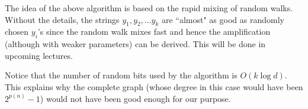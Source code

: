 The idea of the above algorithm is based on the rapid mixing of random walks. Without the details, the strings $y_1, y_2, \ldots y_k$ are ``almost" as good as randomly chosen $y_i$'s since the random walk mixes fast and hence the amplification (although with weaker parameters) can be derived. This will be done in upcoming lectures.

Notice that the number of random bits used by the algorithm is $O(k \log d)$. This explains why the complete graph (whose degree in this case would have been $2^{p(n)}-1$) would not have been good enough for our purpose.

